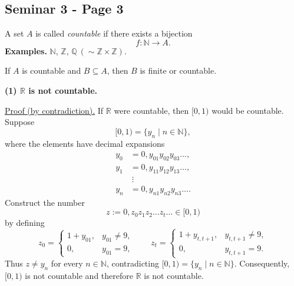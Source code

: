 
\subsection*{Seminar 3 - Page 3}

\noindent A set $A$ is called \emph{countable} if there exists a bijection
\[
  f:\mathbb N\longrightarrow A.
\]
\noindent\textbf{Examples.} $\mathbb N$, $\mathbb Z$,
$\mathbb Q\ (\sim\mathbb Z\times\mathbb Z)$.

\noindent If $A$ is countable and $B\subseteq A$, then $B$ is
finite or countable.

\medskip
\noindent\textbf{(1) $\mathbb R$ is not countable.}

\noindent\underline{Proof (by contradiction).}
If $\mathbb R$ were countable, then $[0,1)$ would be countable.
Suppose
\[
  [0,1)=\{y_n\mid n\in\mathbb N\},
\]
where the elements have decimal expansions
\[
\begin{aligned}
 y_0 &= 0,y_{01}y_{02}y_{03}\ldots,\\
 y_1 &= 0,y_{11}y_{12}y_{13}\ldots,\\
     &\ \vdots\\
 y_n &= 0,y_{n1}y_{n2}y_{n3}\ldots .
\end{aligned}
\]
Construct the number
\[
  z:=0,z_0z_1z_2\ldots z_t\ldots\in[0,1)
\]
by defining
\[
 z_0=\begin{cases}
       1+y_{01},&y_{01}\neq9,\\
       0,&y_{01}=9,
     \end{cases}
 \qquad
 z_t=\begin{cases}
       1+y_{t,t+1},&y_{t,t+1}\neq9,\\
       0,&y_{t,t+1}=9.
     \end{cases}
\]
Thus $z\neq y_n$ for every $n\in\mathbb N$, contradicting
$[0,1)=\{y_n\mid n\in\mathbb N\}$.
Consequently, $[0,1)$ is not countable and therefore
$\mathbb R$ is not countable.

